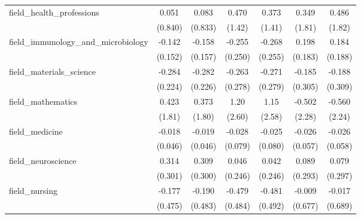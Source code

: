 \begin{tabular}{lcccccc}
   field\_health\_professions                                  & 0.051         & 0.083        & 0.470         & 0.373         & 0.349         & 0.486\\   
                                                               & (0.840)       & (0.833)      & (1.42)        & (1.41)        & (1.81)        & (1.82)\\   
   field\_immunology\_and\_microbiology                        & -0.142        & -0.158       & -0.255        & -0.268        & 0.198         & 0.184\\   
                                                               & (0.152)       & (0.157)      & (0.250)       & (0.255)       & (0.183)       & (0.188)\\   
   field\_materials\_science                                   & -0.284        & -0.282       & -0.263        & -0.271        & -0.185        & -0.188\\   
                                                               & (0.224)       & (0.226)      & (0.278)       & (0.279)       & (0.305)       & (0.309)\\   
   field\_mathematics                                          & 0.423         & 0.373        & 1.20          & 1.15          & -0.502        & -0.560\\   
                                                               & (1.81)        & (1.80)       & (2.60)        & (2.58)        & (2.28)        & (2.24)\\   
   field\_medicine                                             & -0.018        & -0.019       & -0.028        & -0.025        & -0.026        & -0.026\\   
                                                               & (0.046)       & (0.046)      & (0.079)       & (0.080)       & (0.057)       & (0.058)\\   
   field\_neuroscience                                         & 0.314         & 0.309        & 0.046         & 0.042         & 0.089         & 0.079\\   
                                                               & (0.301)       & (0.300)      & (0.246)       & (0.246)       & (0.293)       & (0.297)\\   
   field\_nursing                                              & -0.177        & -0.190       & -0.479        & -0.481        & -0.009        & -0.017\\   
                                                               & (0.475)       & (0.483)      & (0.484)       & (0.492)       & (0.677)       & (0.689)\\   

\end{tabular}
